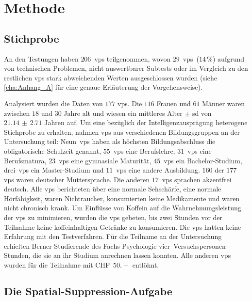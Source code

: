 \documentclass[11pt, twoside, a4paper]{book}		%
\begin{document}
\chapter{Methode \label{cha:Methode}}

\section{Stichprobe \label{sec:Stichprobe}}

An den Testungen haben $206$~\glspl{vp} teilgenommen, wovon $29$~\glspl{vp}~($14\,\%$) aufgrund von technischen Problemen, nicht auswertbarer Subtests oder im Vergleich zu den restlichen \glspl{vp} stark abweichenden Werten ausgeschlossen wurden (siehe \autoref{cha:Anhang_A} für eine genaue Erläuterung der Vorgehensweise).

Analysiert wurden die Daten von $177$ \glspl{vp}. Die $116$ Frauen und $61$ Männer waren zwischen $18$ und $30$ Jahre alt und wiesen ein mittleres Alter $\pm$ \gls{sd} von $21.14\,\pm\,2.71$ Jahren auf. 
Um eine bezüglich der Intelligenzausprägung heterogene Stichprobe zu erhalten, nahmen \glspl{vp} aus verschiedenen Bildungsgruppen an der Untersuchung teil:
Neun~\glspl{vp} haben als höchsten Bildungsabschluss die obligatorische Schulzeit genannt,
$55$~\glspl{vp} eine Berufslehre,
$31$~\glspl{vp} eine Berufsmatura,
$23$~\glspl{vp} eine gymnasiale Maturität,
$45$~\glspl{vp} ein Bachelor-Studium,
drei~\glspl{vp} ein Master-Studium und 
$11$~\glspl{vp} eine andere Ausbildung.
$160$ der $177$ \glspl{vp} waren deutscher Muttersprache. Die anderen $17$~\glspl{vp} sprachen akzentfrei deutsch. Alle \glspl{vp} berichteten über eine normale Sehschärfe, eine normale Hörfähigkeit, waren Nichtraucher, konsumierten keine Medikamente und waren nicht chronisch krank. Um Einflüsse von Koffein auf die Wahrnehmungsleistung \citep[][]{Stough1995} der \glspl{vp} zu minimieren, wurden die \glspl{vp} gebeten, bis zwei Stunden vor der Teilnahme keine koffeinhaltigen Getränke zu konsumieren. Die \glspl{vp} hatten keine Erfahrung mit den Testverfahren. 
Für die Teilname an der Untersuchung erhielten Berner Studierende des Fachs Psychologie vier~Ver\-suchs\-per\-sonen-Stun\-den, die sie an ihr Studium anrechnen lassen konnten. Alle anderen \glspl{vp} wurden für die Teilnahme mit CHF~$50.-$ entlöhnt.




\section{Die Spatial-Suppression-Aufgabe \label{sec:}}
\end{document}
